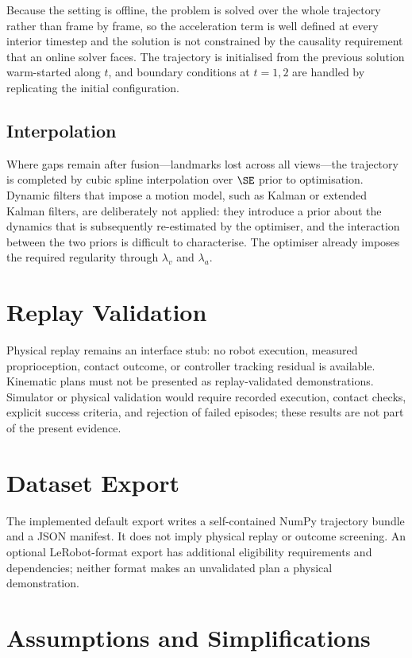 Because the setting is offline, the problem is solved over the whole trajectory
rather than frame by frame, so the acceleration term is well defined at every
interior timestep and the solution is not constrained by the causality
requirement that an online solver faces. The trajectory is initialised from the
previous solution warm-started along $t$, and boundary conditions at $t=1,2$
are handled by replicating the initial configuration.

\subsection{Interpolation}

Where gaps remain after fusion---landmarks lost across all views---the
trajectory is completed by cubic spline interpolation over $\SE$ prior to
optimisation. Dynamic filters that impose a motion model, such as Kalman or
extended Kalman filters, are deliberately not applied: they introduce a prior
about the dynamics that is subsequently re-estimated by the optimiser, and the
interaction between the two priors is difficult to characterise. The optimiser
already imposes the required regularity through
$\lambda_v$ and $\lambda_a$.

\section{Replay Validation}
\label{sec:replay}

Physical replay remains an interface stub: no robot execution, measured
proprioception, contact outcome, or controller tracking residual is available.
Kinematic plans must not be presented as replay-validated demonstrations.
Simulator or physical validation would require recorded execution, contact
checks, explicit success criteria, and rejection of failed episodes; these
results are not part of the present evidence.

\section{Dataset Export}
\label{sec:export}

The implemented default export writes a self-contained NumPy trajectory bundle
and a JSON manifest. It does not imply physical replay or outcome screening.
An optional LeRobot-format export has additional eligibility requirements and
dependencies; neither format makes an unvalidated plan a physical
demonstration.

\section{Assumptions and Simplifications}
\label{sec:assumptions}

